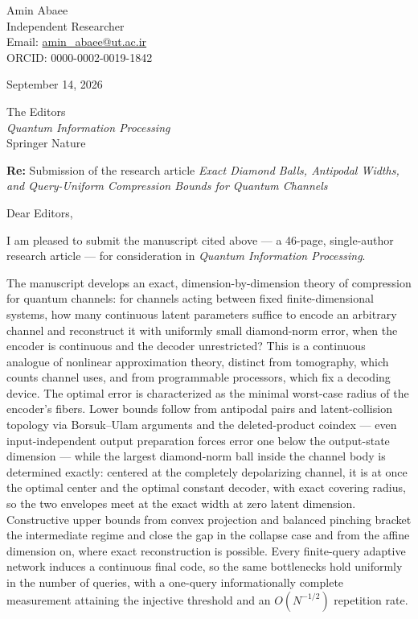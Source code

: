 \documentclass[10pt,a4paper]{article}
\begin{document}
\pagestyle{empty}

\noindent
\begin{minipage}[t]{0.60\textwidth}
Amin Abaee\\
Independent Researcher\\
Email: \href{mailto:amin\_abaee@ut.ac.ir}{amin\_abaee@ut.ac.ir}\\
ORCID: 0000-0002-0019-1842
\end{minipage}%
\hfill
\begin{minipage}[t]{0.36\textwidth}
\raggedleft
September 14, 2026
\end{minipage}

\vspace{1.0em}

\noindent The Editors\\
\emph{Quantum Information Processing}\\
Springer Nature

\vspace{1.0em}

\noindent\textbf{Re:} Submission of the research article \emph{Exact Diamond Balls, Antipodal Widths, and Query-Uniform Compression Bounds for Quantum Channels}

\vspace{1.0em}

\noindent Dear Editors,

I am pleased to submit the manuscript cited above --- a 46-page, single-author research article --- for consideration in \emph{Quantum Information Processing}.

The manuscript develops an exact, dimension-by-dimension theory of compression for quantum channels: for channels acting between fixed finite-dimensional systems, how many continuous latent parameters suffice to encode an arbitrary channel and reconstruct it with uniformly small diamond-norm error, when the encoder is continuous and the decoder unrestricted? This is a continuous analogue of nonlinear approximation theory, distinct from tomography, which counts channel uses, and from programmable processors, which fix a decoding device. The optimal error is characterized as the minimal worst-case radius of the encoder's fibers. Lower bounds follow from antipodal pairs and latent-collision topology via Borsuk--Ulam arguments and the deleted-product coindex --- even input-independent output preparation forces error one below the output-state dimension --- while the largest diamond-norm ball inside the channel body is determined exactly: centered at the completely depolarizing channel, it is at once the optimal center and the optimal constant decoder, with exact covering radius, so the two envelopes meet at the exact width at zero latent dimension. Constructive upper bounds from convex projection and balanced pinching bracket the intermediate regime and close the gap in the collapse case and from the affine dimension on, where exact reconstruction is possible. Every finite-query adaptive network induces a continuous final code, so the same bottlenecks hold uniformly in the number of queries, with a one-query informationally complete measurement attaining the injective threshold and an $O(N^{-1/2})$ repetition rate.
\end{document}
